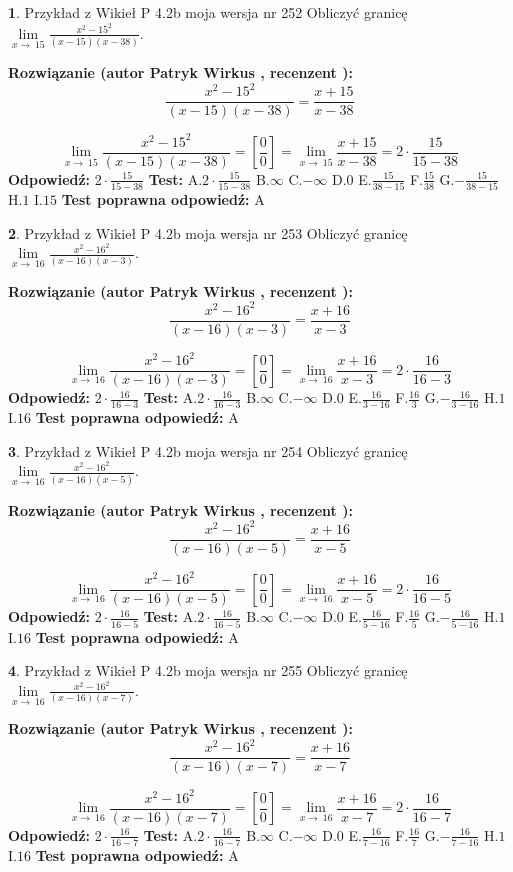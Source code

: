 \documentclass[12pt, a4paper]{article}
\theoremstyle{definition} %
\newtheorem{zad}{}
\newcommand{\zadStart}[1]{\begin{zad}#1\newline}
\newcommand{\zadStop}{\end{zad}}
\newcommand{\rozwStart}[2]{\noindent \textbf{Rozwiązanie (autor #1 , recenzent #2): }\newline}
\newcommand{\rozwStop}{\newline}
\newcommand{\odpStart}{\noindent \textbf{Odpowiedź:}\newline}
\newcommand{\odpStop}{\newline}
\newcommand{\testStart}{\noindent \textbf{Test:}\newline}
\newcommand{\testStop}{\newline}
\newcommand{\kluczStart}{\noindent \textbf{Test poprawna odpowiedź:}\newline}
\newcommand{\kluczStop}{\newline}
\begin{document}
\zadStart{Przykład z Wikieł P 4.2b moja wersja nr 252}
Obliczyć granicę $\lim\limits_{x\to\ 15}\frac{x^{2}-15^{2}}{(x-15)(x-38)}$.
\zadStop
\rozwStart{Patryk Wirkus}{}
$$\frac{x^{2}-15^{2}}{(x-15)(x-38)}=\frac{x+15}{x-38}$$

$$\lim\limits_{x\to\ 15}\frac{x^{2}-15^{2}}{(x-15)(x-38)}=[\frac{0}{0}]=\lim\limits_{x\to\ 15}\frac{x+15}{x-38}=2 \cdot \frac{15}{15-38}$$
\rozwStop
\odpStart
$2 \cdot \frac{15}{15-38}$
\odpStop
\testStart
A.$2 \cdot \frac{15}{15-38}$
B.$\infty$
C.$-\infty$
D.$0$
E.$\frac{15}{38-15}$
F.$\frac{15}{38}$
G.$-\frac{15}{38-15}$
H.$1$
I.$15$
\testStop
\kluczStart
A
\kluczStop



\zadStart{Przykład z Wikieł P 4.2b moja wersja nr 253}
Obliczyć granicę $\lim\limits_{x\to\ 16}\frac{x^{2}-16^{2}}{(x-16)(x-3)}$.
\zadStop
\rozwStart{Patryk Wirkus}{}
$$\frac{x^{2}-16^{2}}{(x-16)(x-3)}=\frac{x+16}{x-3}$$

$$\lim\limits_{x\to\ 16}\frac{x^{2}-16^{2}}{(x-16)(x-3)}=[\frac{0}{0}]=\lim\limits_{x\to\ 16}\frac{x+16}{x-3}=2 \cdot \frac{16}{16-3}$$
\rozwStop
\odpStart
$2 \cdot \frac{16}{16-3}$
\odpStop
\testStart
A.$2 \cdot \frac{16}{16-3}$
B.$\infty$
C.$-\infty$
D.$0$
E.$\frac{16}{3-16}$
F.$\frac{16}{3}$
G.$-\frac{16}{3-16}$
H.$1$
I.$16$
\testStop
\kluczStart
A
\kluczStop



\zadStart{Przykład z Wikieł P 4.2b moja wersja nr 254}
Obliczyć granicę $\lim\limits_{x\to\ 16}\frac{x^{2}-16^{2}}{(x-16)(x-5)}$.
\zadStop
\rozwStart{Patryk Wirkus}{}
$$\frac{x^{2}-16^{2}}{(x-16)(x-5)}=\frac{x+16}{x-5}$$

$$\lim\limits_{x\to\ 16}\frac{x^{2}-16^{2}}{(x-16)(x-5)}=[\frac{0}{0}]=\lim\limits_{x\to\ 16}\frac{x+16}{x-5}=2 \cdot \frac{16}{16-5}$$
\rozwStop
\odpStart
$2 \cdot \frac{16}{16-5}$
\odpStop
\testStart
A.$2 \cdot \frac{16}{16-5}$
B.$\infty$
C.$-\infty$
D.$0$
E.$\frac{16}{5-16}$
F.$\frac{16}{5}$
G.$-\frac{16}{5-16}$
H.$1$
I.$16$
\testStop
\kluczStart
A
\kluczStop



\zadStart{Przykład z Wikieł P 4.2b moja wersja nr 255}
Obliczyć granicę $\lim\limits_{x\to\ 16}\frac{x^{2}-16^{2}}{(x-16)(x-7)}$.
\zadStop
\rozwStart{Patryk Wirkus}{}
$$\frac{x^{2}-16^{2}}{(x-16)(x-7)}=\frac{x+16}{x-7}$$

$$\lim\limits_{x\to\ 16}\frac{x^{2}-16^{2}}{(x-16)(x-7)}=[\frac{0}{0}]=\lim\limits_{x\to\ 16}\frac{x+16}{x-7}=2 \cdot \frac{16}{16-7}$$
\rozwStop
\odpStart
$2 \cdot \frac{16}{16-7}$
\odpStop
\testStart
A.$2 \cdot \frac{16}{16-7}$
B.$\infty$
C.$-\infty$
D.$0$
E.$\frac{16}{7-16}$
F.$\frac{16}{7}$
G.$-\frac{16}{7-16}$
H.$1$
I.$16$
\testStop
\kluczStart
A
\kluczStop
\end{document}
